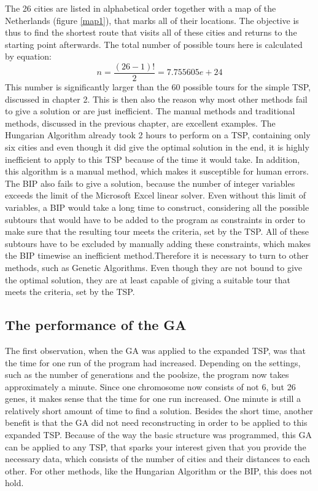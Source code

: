 \par
The 26 cities are listed in alphabetical order together with a map of the Netherlands (figure \ref{map1}), that marks all of their locations. The objective is thus to find the shortest route that visits all of these cities and returns to the starting point afterwards. The total number of possible tours here is calculated by equation: %
\[n = \frac{(26-1)!}{2} =  7.755605e+24\]
This number is significantly larger than the 60 possible tours for the simple TSP, discussed in chapter 2. This is then also the reason why most other methods fail to give a solution or are just inefficient. The manual methods and traditional methods, discussed in the previous chapter, are excellent examples. The Hungarian Algorithm already took 2 hours to perform on a TSP, containing only six cities and even though it did give the optimal solution in the end, it is highly inefficient to apply to this TSP because of the time it would take. In addition, this algorithm is a manual method, which makes it susceptible for human errors. The BIP also fails to give a solution, because the number of integer variables exceeds the limit of the Microsoft Excel linear solver. Even without this limit of variables, a BIP would take a long time to construct, considering all the possible subtours that would have to be added to the program as constraints in order to make sure that the resulting tour meets the criteria, set by the TSP. All of these subtours have to be excluded by manually adding these constraints, which makes the BIP timewise an inefficient method.Therefore it is necessary to turn to other methods, such as Genetic Algorithms. Even though they are not bound to give the optimal solution, they are at least capable of giving a suitable tour that meets the criteria, set by the TSP.



\subsection{The performance of the GA} %
\par
The first observation, when the GA was applied to the expanded TSP, was that the time for one run of the program had increased. Depending on the settings, such as the number of generations and the poolsize, the program now takes approximately a minute. Since one chromosome now consists of not 6, but 26 genes, it makes sense that the time for one run increased. One minute is still a relatively short amount of time to find a solution. Besides the short time, another benefit is that the GA did not need reconstructing in order to be applied to this expanded TSP. Because of the way the basic structure was programmed, this GA can be applied to any TSP, that sparks your interest given that you provide the necessary data, which consists of the number of cities and their distances to each other. For other methods, like the Hungarian Algorithm or the BIP, this does not hold. 

